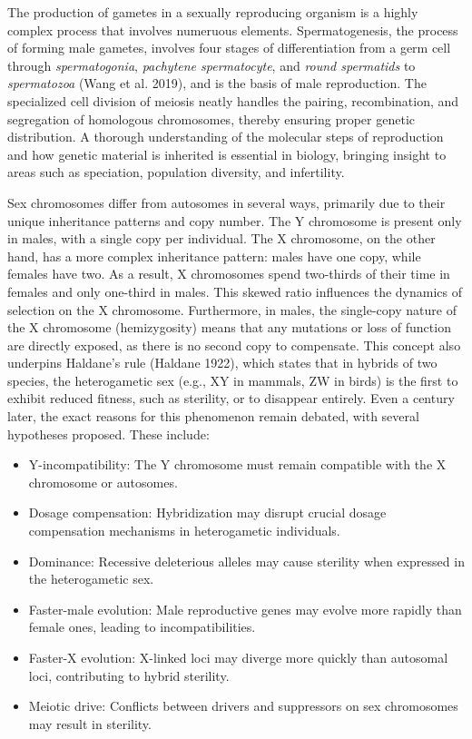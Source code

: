 \documentclass[
  11pt,
  a4paper,
]{scrbook}
\providecommand{\tightlist}{%
  \setlength{\itemsep}{0pt}\setlength{\parskip}{0pt}}\usepackage{longtable,booktabs,array}
\begin{document}
The production of gametes in a sexually reproducing organism is a highly
complex process that involves numeruous elements. Spermatogenesis, the
process of forming male gametes, involves four stages of differentiation
from a germ cell through \emph{spermatogonia}, \emph{pachytene
spermatocyte}, and \emph{round spermatids} to \emph{spermatozoa} (Wang
et al. 2019), and is the basis of male reproduction. The specialized
cell division of meiosis neatly handles the pairing, recombination, and
segregation of homologous chromosomes, thereby ensuring proper genetic
distribution. A thorough understanding of the molecular steps of
reproduction and how genetic material is inherited is essential in
biology, bringing insight to areas such as speciation, population
diversity, and infertility.

Sex chromosomes differ from autosomes in several ways, primarily due to
their unique inheritance patterns and copy number. The Y chromosome is
present only in males, with a single copy per individual. The X
chromosome, on the other hand, has a more complex inheritance pattern:
males have one copy, while females have two. As a result, X chromosomes
spend two-thirds of their time in females and only one-third in males.
This skewed ratio influences the dynamics of selection on the X
chromosome. Furthermore, in males, the single-copy nature of the X
chromosome (hemizygosity) means that any mutations or loss of function
are directly exposed, as there is no second copy to compensate. This
concept also underpins Haldane's rule (Haldane 1922), which states that
in hybrids of two species, the heterogametic sex (e.g., XY in mammals,
ZW in birds) is the first to exhibit reduced fitness, such as sterility,
or to disappear entirely. Even a century later, the exact reasons for
this phenomenon remain debated, with several hypotheses proposed. These
include:

\begin{itemize}
\tightlist
\item
  Y-incompatibility: The Y chromosome must remain compatible with the X
  chromosome or autosomes.
\item
  Dosage compensation: Hybridization may disrupt crucial dosage
  compensation mechanisms in heterogametic individuals.
\item
  Dominance: Recessive deleterious alleles may cause sterility when
  expressed in the heterogametic sex.
\item
  Faster-male evolution: Male reproductive genes may evolve more rapidly
  than female ones, leading to incompatibilities.
\item
  Faster-X evolution: X-linked loci may diverge more quickly than
  autosomal loci, contributing to hybrid sterility.
\item
  Meiotic drive: Conflicts between drivers and suppressors on sex
  chromosomes may result in sterility.
\end{itemize}
\end{document}
